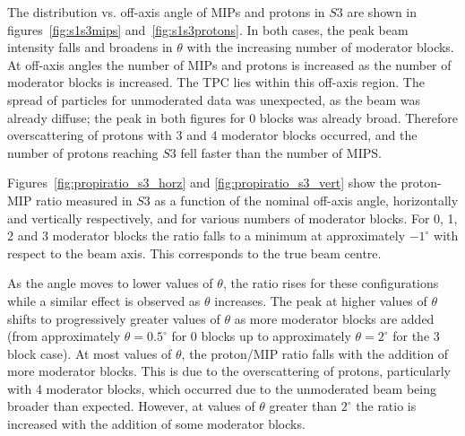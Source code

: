 The distribution vs. off-axis angle of MIPs and protons in $\mathit{S3}$ are shown in figures~\ref{fig:s1s3mips} and~\ref{fig:s1s3protons}.
In both cases, the peak beam intensity falls and broadens in $\theta$ with the increasing number of moderator blocks. 
At off-axis angles the number of MIPs and protons is increased as the number of moderator blocks is increased.
The TPC lies within this off-axis region.
The spread of particles for unmoderated data was unexpected, as the beam was already diffuse; the peak in both figures for 0 blocks was already broad.
Therefore overscattering of protons with 3 and 4 moderator blocks occurred, and the number of protons reaching $\mathit{S3}$ fell faster than the number of MIPS.

Figures~\ref{fig:propiratio_s3_horz} and \ref{fig:propiratio_s3_vert} show the proton-MIP ratio measured in $\mathit{S3}$ as a function of the nominal off-axis angle, horizontally and vertically respectively, and for various numbers of moderator blocks.
For 0, 1, 2 and 3 moderator blocks the ratio falls to a minimum at approximately $-1^{\circ}$ with respect to the beam axis.
This corresponds to the true beam centre.

As the angle moves to lower values of $\theta$, the ratio rises for these configurations while a similar effect is observed as $\theta$ increases.
The peak at higher values of $\theta$ shifts to progressively greater values of $\theta$ as more moderator blocks are added (from approximately $\theta = 0.5^{\circ}$ for 0 blocks up to approximately $\theta = 2^{\circ}$ for the 3 block case).
At most values of $\theta$, the proton/MIP ratio falls with the addition of more moderator blocks. 
This is due to the overscattering of protons, particularly with 4 moderator blocks, which occurred due to the unmoderated beam being broader than expected.
However, at values of $\theta$ greater than $2^{\circ}$ the ratio is increased with the addition of some moderator blocks.


